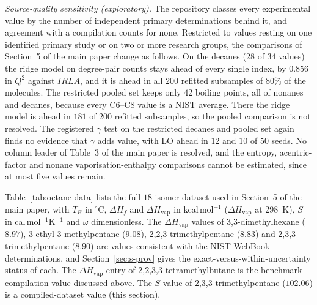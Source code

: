 \documentclass[a5paper, 10pt]{article}
\theoremstyle{plain}
\theoremstyle{remark}
\theoremstyle{definition}
\begin{document}
\emph{Source-quality sensitivity (exploratory).} The repository classes every experimental value by
the number of independent primary determinations behind it, and agreement with a compilation counts
for none. Restricted to values resting on one identified primary study or on two or more research
groups, the comparisons of Section~5 of the main paper change as follows. On the decanes ($28$ of $34$
values) the ridge model on degree-pair counts stays ahead of every single index, by $0.856$ in $Q^2$
against $IRLA$, and it is ahead in all $200$ refitted subsamples of $80\%$ of the molecules. The
restricted pooled set keeps only $42$ boiling points, all of nonanes and decanes, because every C6--C8
value is a NIST average. There the ridge model is ahead in $181$ of $200$ refitted subsamples, so the
pooled comparison is not resolved. The registered $\gamma$ test on the restricted decanes and pooled
set again finds no evidence that $\gamma$ adds value, with LO ahead in $12$ and $10$ of $50$ seeds. No
column leader of Table~3 of the main paper is resolved, and the entropy, acentric-factor and nonane
vaporisation-enthalpy comparisons cannot be estimated, since at most five values remain.



Table~\ref{tab:octane-data} lists the full $18$-isomer dataset used
in Section~5 of the main paper, with $T_B$ in $^{\circ}$C, $\Delta H_f$ and
$\Delta H_{\mathrm{vap}}$ in kcal\,mol$^{-1}$
($\Delta H_{\mathrm{vap}}$ at $298$~K), $S$ in
cal\,mol$^{-1}$K$^{-1}$ and $\omega$ dimensionless. The
$\Delta H_{\mathrm{vap}}$ values of 3,3-dimethylhexane ($8.97$),
3-ethyl-3-methylpentane ($9.08$), 2,2,3-trimethylpentane ($8.83$) and
2,3,3-trimethylpentane ($8.90$) are values consistent with the NIST
WebBook determinations, and Section~\ref{sec:s-prov} gives the
exact-versus-within-uncertainty status of each. The
$\Delta H_{\mathrm{vap}}$ entry of 2,2,3,3-tetramethylbutane is the
benchmark-compilation value discussed above. The $S$ value of
2,3,3-trimethylpentane ($102.06$) is a compiled-dataset value
(this section).
\end{document}
